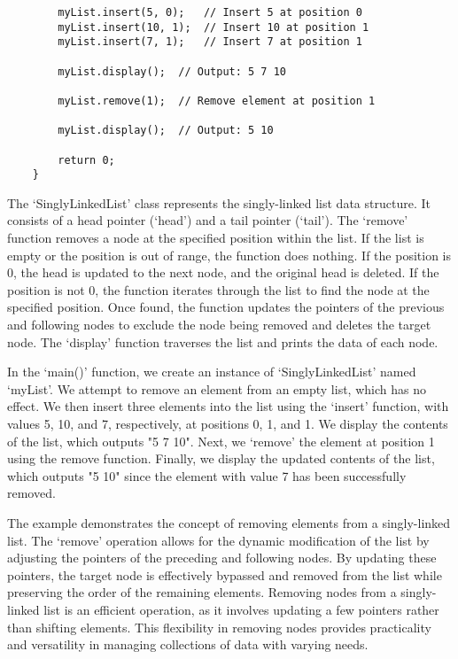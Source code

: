 \begin{solution}
\begin{verbatim}
        myList.insert(5, 0);   // Insert 5 at position 0
        myList.insert(10, 1);  // Insert 10 at position 1
        myList.insert(7, 1);   // Insert 7 at position 1
    
        myList.display();  // Output: 5 7 10
    
        myList.remove(1);  // Remove element at position 1
    
        myList.display();  // Output: 5 10
    
        return 0;
    }        
    \end{verbatim}

    \horizontalline

    The `SinglyLinkedList' class represents the singly-linked list data structure. It consists of a head pointer (`head') and a tail pointer (`tail'). The `remove' function removes a node at the specified position within the list. If the list is empty or the position 
    is out of range, the function does nothing. If the position is 0, the head is updated to the next node, and the original head is deleted. If the position is not 0, the function iterates through the list to find the node at the specified position. Once found, the 
    function updates the pointers of the previous and following nodes to exclude the node being removed and deletes the target node. The `display' function traverses the list and prints the data of each node.

    In the `main()' function, we create an instance of `SinglyLinkedList' named `myList'. We attempt to remove an element from an empty list, which has no effect. We then insert three elements into the list using the `insert' function, with values 5, 10, and 7, respectively, 
    at positions 0, 1, and 1. We display the contents of the list, which outputs "5 7 10". Next, we `remove' the element at position 1 using the remove function. Finally, we display the updated contents of the list, which outputs "5 10" since the element with value 7 has 
    been successfully removed.

    The example demonstrates the concept of removing elements from a singly-linked list. The `remove' operation allows for the dynamic modification of the list by adjusting the pointers of the preceding and following nodes. By updating these pointers, the target node is 
    effectively bypassed and removed from the list while preserving the order of the remaining elements. Removing nodes from a singly-linked list is an efficient operation, as it involves updating a few pointers rather than shifting elements. This flexibility in removing nodes 
    provides practicality and versatility in managing collections of data with varying needs.
\end{solution}
